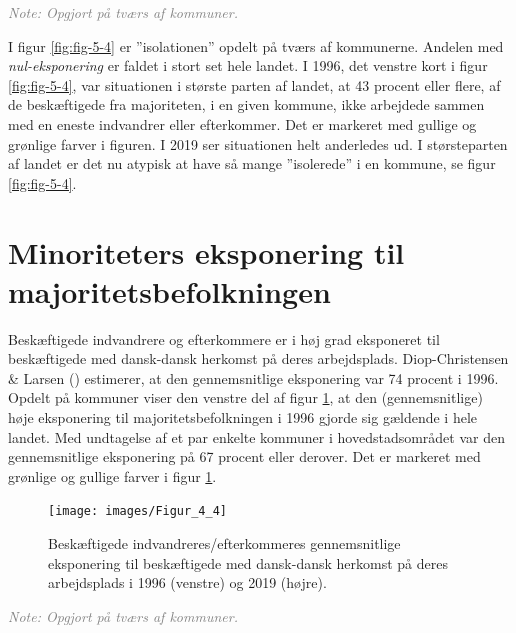 \documentclass[
]{book}
\begin{document}
\begin{footnotesize}\textit{\textcolor{gray}{
Note: Opgjort på tværs af kommuner.
}}
\end{footnotesize}

I figur \ref{fig:fig-5-4} er ''isolationen'' opdelt på tværs af kommunerne. Andelen med \emph{nul-eksponering} er faldet i stort set hele landet. I 1996, det venstre kort i figur \ref{fig:fig-5-4}, var situationen i største parten af landet, at 43 procent eller flere, af de beskæftigede fra majoriteten, i en given kommune, ikke arbejdede sammen med en eneste indvandrer eller efterkommer. Det er markeret med gullige og grønlige farver i figuren. I 2019 ser situationen helt anderledes ud. I størsteparten af landet er det nu atypisk at have så mange ''isolerede'' i en kommune, se figur \ref{fig:fig-5-4}.

\section{Minoriteters eksponering til majoritetsbefolkningen}\label{minoriteters-eksponering-til-majoritetsbefolkningen}

Beskæftigede indvandrere og efterkommere er i høj grad eksponeret til beskæftigede med dansk-dansk herkomst på deres arbejdsplads. Diop-Christensen \& Larsen () estimerer, at den gennemsnitlige eksponering var 74 procent i 1996. Opdelt på kommuner viser den venstre del af figur \ref{fig:fig-5-5}, at den (gennemsnitlige) høje eksponering til majoritetsbefolkningen i 1996 gjorde sig gældende i hele landet. Med undtagelse af et par enkelte kommuner i hovedstadsområdet var den gennemsnitlige eksponering på 67 procent eller derover. Det er markeret med grønlige og gullige farver i figur \ref{fig:fig-5-5}.

\newpage

\begin{figure}
\texttt{[image: images/Figur\_4\_4]} \caption{Beskæftigede indvandreres/efterkommeres gennemsnitlige eksponering til beskæftigede med dansk-dansk herkomst på deres arbejdsplads i 1996 (venstre) og 2019 (højre).}\label{fig:fig-5-5}
\end{figure}

\begin{footnotesize}\textit{\textcolor{gray}{
Note: Opgjort på tværs af kommuner.
}}
\end{footnotesize}
\end{document}
